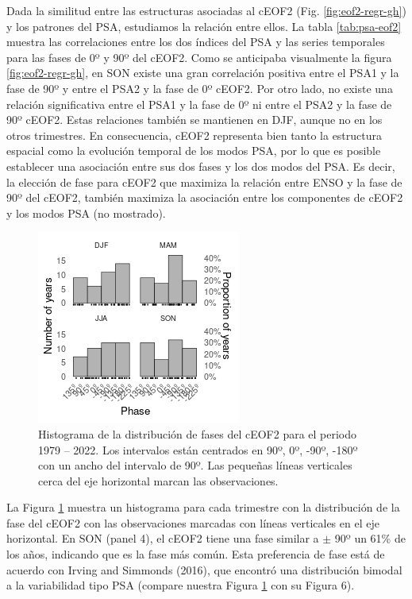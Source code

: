 \documentclass[12pt,oneside]{reedthesis}
\begin{document}
Dada la similitud entre las estructuras asociadas al cEOF2 (Fig. \ref{fig:eof2-regr-gh}) y los patrones del PSA, estudiamos la relación entre ellos.
La tabla \ref{tab:psa-eof2} muestra las correlaciones entre los dos índices del PSA y las series temporales para las fases de 0º y 90º del cEOF2.
Como se anticipaba visualmente la figura \ref{fig:eof2-regr-gh}, en SON existe una gran correlación positiva entre el PSA1 y la fase de 90º y entre el PSA2 y la fase de 0º cEOF2.
Por otro lado, no existe una relación significativa entre el PSA1 y la fase de 0º ni entre el PSA2 y la fase de 90º cEOF2.
Estas relaciones también se mantienen en DJF, aunque no en los otros trimestres.
En consecuencia, cEOF2 representa bien tanto la estructura espacial como la evolución temporal de los modos PSA, por lo que es posible establecer una asociación entre sus dos fases y los dos modos del PSA.
Es decir, la elección de fase para cEOF2 que maximiza la relación entre ENSO y la fase de 90º del cEOF2, también maximiza la asociación entre los componentes de cEOF2 y los modos PSA (no mostrado).





\begin{figure}
\includegraphics{figures/40-sam-ceof/phase-histogram-1} \caption{Histograma de la distribución de fases del cEOF2 para el periodo 1979 -- 2022.
Los intervalos están centrados en 90º, 0º, -90º, -180º con un ancho del intervalo de 90º.
Las pequeñas líneas verticales cerca del eje horizontal marcan las observaciones.}\label{fig:phase-histogram}
\end{figure}

La Figura \ref{fig:phase-histogram} muestra un histograma para cada trimestre con la distribución de la fase del cEOF2 con las observaciones marcadas con líneas verticales en el eje horizontal.
En SON (panel 4), el cEOF2 tiene una fase similar a \(\pm\) 90º un 61\% de los años, indicando que es la fase más común.
Esta preferencia de fase está de acuerdo con Irving and Simmonds (2016), que encontró una distribución bimodal a la variabilidad tipo PSA (compare nuestra Figura \ref{fig:phase-histogram} con su Figura 6).
\end{document}
